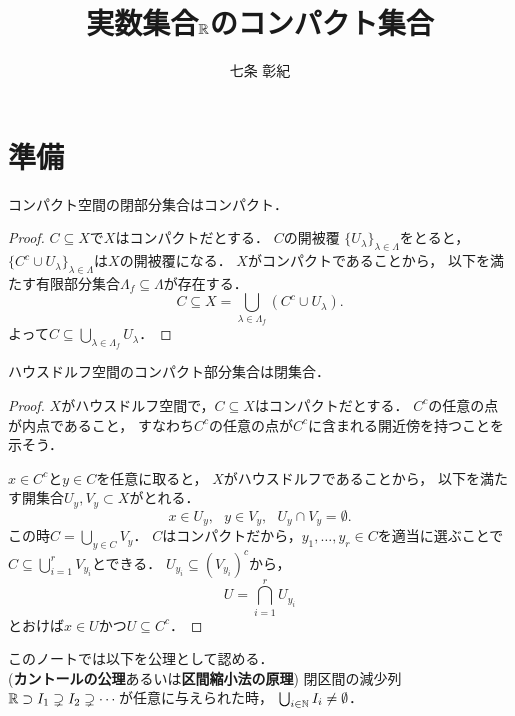\documentclass[]{jsarticle}
\title{実数集合$\mathbb{R}$のコンパクト集合}
\author{七条 彰紀}
\begin{document}
\maketitle

\section{準備}
\begin{Lemma}\label{lemma:1}
    コンパクト空間の閉部分集合はコンパクト．
\end{Lemma}
\begin{proof}
    $C \subseteq X$で$X$はコンパクトだとする．
    $C$の開被覆 $\{U_{\lambda}\}_{\lambda \in \Lambda}$をとると，
    $\{C^c \cup U_{\lambda}\}_{\lambda \in \Lambda}$は$X$の開被覆になる．
    $X$がコンパクトであることから，
    以下を満たす有限部分集合$\Lambda_f \subseteq \Lambda$が存在する．
    \[ C \subseteq X=\bigcup_{\lambda \in \Lambda_f} (C^c \cup U_{\lambda}). \]
    よって$C \subseteq \bigcup_{\lambda \in \Lambda_f} U_{\lambda}$．
\end{proof}

\begin{Lemma}\label{lemma:2}
    ハウスドルフ空間のコンパクト部分集合は閉集合．
\end{Lemma}
\begin{proof}
    $X$がハウスドルフ空間で，$C \subseteq X$はコンパクトだとする．
    $C^c$の任意の点が内点であること，
    すなわち$C^c$の任意の点が$C^c$に含まれる開近傍を持つことを示そう．

    $x \in C^c$と$y \in C$を任意に取ると，
    $X$がハウスドルフであることから，
    以下を満たす開集合$U_y, V_y \subset X$がとれる．
    \[ x \in U_y,~~~ y \in V_y,~~~ U_y \cap V_y = \emptyset. \]
    この時$C=\bigcup_{y \in C} V_y$．
    $C$はコンパクトだから，$y_1,\dots,y_r \in C$を適当に選ぶことで
    $C \subseteq \bigcup_{i=1}^r V_{y_i}$とできる．
    $U_{y_i} \subseteq (V_{y_i})^c$から，
    \[ U=\bigcap_{i=1}^r U_{y_i} \]
    とおけば$x \in U$かつ$U \subseteq C^c$．
\end{proof}

\begin{Remark}\label{remark:1}
    このノートでは以下を公理として認める． \\
    (\textbf{カントールの公理}あるいは\textbf{区間縮小法の原理})
    閉区間の減少列 $\mathbb{R} \supset I_1 \supsetneq I_2 \supsetneq \cdots$が任意に与えられた時，
    $\bigcup_{i \in \mathbb{N}} I_i \neq \emptyset$．
\end{Remark}
\end{document}
